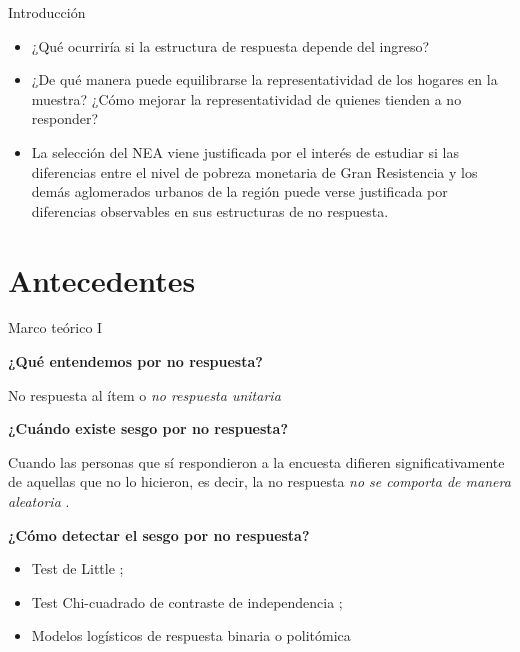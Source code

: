 \documentclass[10pt]{beamer}
\begin{document}
\begin{frame}[fragile]{Introducción}

\begin{itemize}
    \item ¿Qué ocurriría si la estructura de respuesta depende del ingreso?
    \item ¿De qué manera puede equilibrarse la representatividad de los hogares en la muestra? ¿Cómo mejorar la representatividad de quienes tienden a no responder?
    \item La selección del NEA viene justificada por el interés de estudiar si las diferencias entre el nivel de pobreza monetaria de Gran Resistencia y los demás aglomerados urbanos de la región puede verse justificada por diferencias observables en sus estructuras de no respuesta.
\end{itemize}

\end{frame}

\section{Antecedentes}

\begin{frame}[fragile]{Marco teórico I}

\rightarrow \textbf{¿Qué entendemos por no respuesta?} 

No respuesta al ítem o \textit{no respuesta unitaria} \cite{korinek07}


\rightarrow \textbf{¿Cuándo existe sesgo por no respuesta?} 

Cuando las personas que sí respondieron a la encuesta difieren significativamente de aquellas que no lo hicieron, es decir, la no respuesta \textit{no se comporta de manera aleatoria} \cite{wmethods}.

\rightarrow \textbf{¿Cómo detectar el sesgo por no respuesta?}

\begin{itemize}
    \item Test de Little \cite{tesisgonz};
    \item Test Chi-cuadrado de contraste de independencia \cite{handbook};
    \item Modelos logísticos de respuesta binaria o politómica \cite{handbook}
\end{itemize}

\end{frame}
\end{document}
